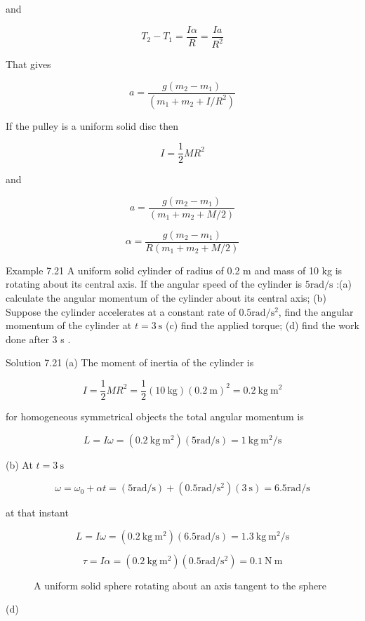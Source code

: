 \documentclass[10pt]{article}
\numberwithin{equation}{section}
\begin{document}
and

$$
T_{2}-T_{1}=\frac{I \alpha}{R}=\frac{I a}{R^{2}}
$$

That gives

$$
a=\frac{g\left(m_{2}-m_{1}\right)}{\left(m_{1}+m_{2}+I / R^{2}\right)}
$$

If the pulley is a uniform solid disc then

$$
I=\frac{1}{2} M R^{2}
$$

and

$$
a=\frac{g\left(m_{2}-m_{1}\right)}{\left(m_{1}+m_{2}+M / 2\right)}
$$

$$
\alpha=\frac{g\left(m_{2}-m_{1}\right)}{R\left(m_{1}+m_{2}+M / 2\right)}
$$

Example 7.21 A uniform solid cylinder of radius of 0.2 m and mass of 10 kg is rotating about its central axis. If the angular speed of the cylinder is $5 \mathrm{rad} / \mathrm{s}$ :(a) calculate the angular momentum of the cylinder about its central axis; (b) Suppose the cylinder accelerates at a constant rate of $0.5 \mathrm{rad} / \mathrm{s}^{2}$, find the angular momentum of the cylinder at $t=3 \mathrm{~s}$ (c) find the applied torque; (d) find the work done after 3 s .

Solution 7.21 (a) The moment of inertia of the cylinder is

$$
I=\frac{1}{2} M R^{2}=\frac{1}{2}(10 \mathrm{~kg})(0.2 \mathrm{~m})^{2}=0.2 \mathrm{~kg} \mathrm{~m}^{2}
$$

for homogeneous symmetrical objects the total angular momentum is

$$
L=I \omega=\left(0.2 \mathrm{~kg} \mathrm{~m}^{2}\right)(5 \mathrm{rad} / \mathrm{s})=1 \mathrm{~kg} \mathrm{~m}^{2} / \mathrm{s}
$$

(b) At $t=3 \mathrm{~s}$

$$
\omega=\omega_{0}+\alpha t=(5 \mathrm{rad} / \mathrm{s})+\left(0.5 \mathrm{rad} / \mathrm{s}^{2}\right)(3 \mathrm{~s})=6.5 \mathrm{rad} / \mathrm{s}
$$

at that instant

$$
L=I \omega=\left(0.2 \mathrm{~kg} \mathrm{~m}^{2}\right)(6.5 \mathrm{rad} / \mathrm{s})=1.3 \mathrm{~kg} \mathrm{~m}^{2} / \mathrm{s}
$$


\begin{equation*}
\tau=I \alpha=\left(0.2 \mathrm{~kg} \mathrm{~m}^{2}\right)\left(0.5 \mathrm{rad} / \mathrm{s}^{2}\right)=0.1 \mathrm{~N} \mathrm{~m} \tag{c}
\end{equation*}


\begin{figure}[htbp]
\caption{A uniform solid sphere rotating about an axis tangent to the sphere}\label{fig:7-27}
\end{figure}
(d)
\end{document}
